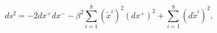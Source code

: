 \begin{equation}
\label{metmaxpp}
ds^2 = - 2 dx^+ dx^- - \beta^2 \sum_{i=1}^8 (\tilde{x}^i)^2 
(dx^+)^2 + \sum_{i=1}^8 (d\tilde{x}^i)^2, 
\end{equation}

